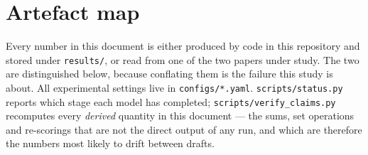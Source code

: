 \documentclass[11pt,a4paper]{article}
\begin{document}
\appendix
\section{Artefact map}

Every number in this document is either produced by code in this repository and
stored under \texttt{results/}, or read from one of the two papers under study.
The two are distinguished below, because conflating them is the failure this study
is about. All experimental settings live in \texttt{configs/*.yaml}.
\texttt{scripts/status.py} reports which stage each model has completed;
\texttt{scripts/verify\_claims.py} recomputes every \emph{derived} quantity in
this document --- the sums, set operations and re-scorings that are not the direct
output of any run, and which are therefore the numbers most likely to drift
between drafts.
\end{document}
